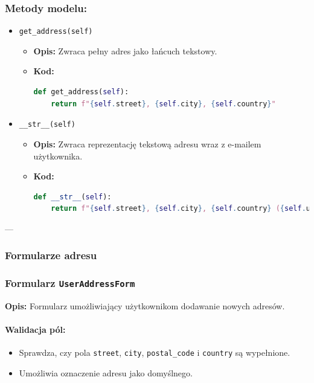 \documentclass[12pt,a4paper,oneside]{article}
\theoremstyle{definition}
\numberwithin{equation}{section}
\begin{document}
\subsubsection{Metody modelu:}
\begin{itemize}
    \item \texttt{get\_address(self)}  
        \begin{itemize}
            \item \textbf{Opis:} Zwraca pełny adres jako łańcuch tekstowy.
            \item \textbf{Kod:}
            \begin{lstlisting}[language=Python, caption=Metoda get\_address]
def get_address(self):
    return f"{self.street}, {self.city}, {self.country}"
            \end{lstlisting}
        \end{itemize}
    \item \texttt{\_\_str\_\_(self)}  
        \begin{itemize}
            \item \textbf{Opis:} Zwraca reprezentację tekstową adresu wraz z e-mailem użytkownika.
            \item \textbf{Kod:}
            \begin{lstlisting}[language=Python, caption=Metoda \_\_str\_\_]
def __str__(self):
    return f"{self.street}, {self.city}, {self.country} ({self.user.email})"
            \end{lstlisting}
        \end{itemize}
\end{itemize}

---
\subsubsection{Formularze adresu}
\linespread{1.3}
\subsubsection*{Formularz \texttt{UserAddressForm}}


\textbf{Opis:}  
Formularz umożliwiający użytkownikom dodawanie nowych adresów.

\paragraph{Walidacja pól:}
\begin{itemize}
    \item Sprawdza, czy pola \texttt{street}, \texttt{city}, \texttt{postal\_code} i \texttt{country} są wypełnione.
    \item Umożliwia oznaczenie adresu jako domyślnego.
\end{itemize}
\end{document}
